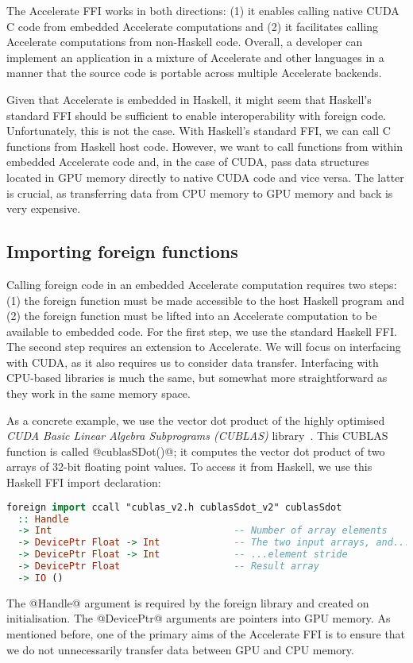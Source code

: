The Accelerate FFI works in both directions: (1) it enables calling native CUDA C code from embedded Accelerate computations and (2) it facilitates calling Accelerate computations from non-Haskell code. Overall, a developer can implement an application in a mixture of Accelerate and other languages in a manner that the source code is portable across multiple Accelerate backends.

Given that Accelerate is embedded in Haskell, it might seem that Haskell's standard FFI should be sufficient to enable interoperability with foreign code. Unfortunately, this is not the case. With Haskell's standard FFI, we can call C functions from Haskell host code. However, we want to call functions from within embedded Accelerate code and, in the case of CUDA, pass data structures located in GPU memory directly to native CUDA code and vice versa. The latter is crucial, as transferring data from CPU memory to GPU memory and back is very expensive.

\subsection{Importing foreign functions}
\label{sec:foreign-import}


Calling foreign code in an embedded Accelerate computation requires two steps: (1) the foreign function must be made accessible to the host Haskell program and (2) the foreign function must be lifted into an Accelerate computation to be available to embedded code. For the first step, we use the standard Haskell FFI. The second step requires an extension to Accelerate. We will focus on interfacing with CUDA, as it also requires us to consider data transfer. Interfacing with CPU-based libraries is much the same, but somewhat more straightforward as they work in the same memory space.

As a concrete example, we use the vector dot product of the highly optimised \emph{CUDA Basic Linear Algebra Subprograms (CUBLAS)} library~\cite{cublas}. This CUBLAS function is called @cublasSDot()@; it computes the vector dot product of two arrays of 32-bit floating point values. To access it from Haskell, we use this Haskell FFI import declaration:
%
\begin{lstlisting}[language=haskell]
foreign import ccall "cublas_v2.h cublasSdot_v2" cublasSdot
  :: Handle
  -> Int                                -- Number of array elements
  -> DevicePtr Float -> Int             -- The two input arrays, and...
  -> DevicePtr Float -> Int             -- ...element stride
  -> DevicePtr Float                    -- Result array
  -> IO ()
\end{lstlisting}
%
The @Handle@ argument is required by the foreign library and created on
initialisation. The @DevicePtr@ arguments are pointers into GPU memory. As mentioned before, one of the primary aims of the Accelerate FFI is to ensure that we do not unnecessarily transfer data between GPU and CPU memory.

